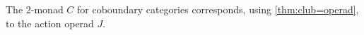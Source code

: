 \begin{cor}
The $2$-monad $C$ for coboundary categories corresponds, using  \cref{thm:club=operad}, to the action operad $J$.
\end{cor}





